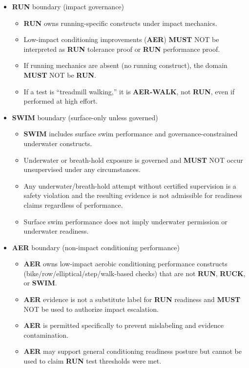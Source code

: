 \documentclass[10pt]{article}
\begin{document}
\begin{itemize}
\item \textbf{RUN} boundary (impact governance)

  \begin{itemize}
  \item \textbf{RUN} owns running-specific constructs under impact mechanics.
  \item Low-impact conditioning improvements (\textbf{AER}) \textbf{MUST} NOT be interpreted as \textbf{RUN} tolerance proof or \textbf{RUN} performance proof.
  \item If running mechanics are absent (no running construct), the domain \textbf{MUST} NOT be \textbf{RUN}.
  \item If a test is “treadmill walking,” it is \textbf{AER-WALK}, not \textbf{RUN}, even if performed at high effort.
  \end{itemize}

\item \textbf{SWIM} boundary (surface-only unless governed)

  \begin{itemize}
  \item \textbf{SWIM} includes surface swim performance and governance-constrained underwater constructs.
  \item Underwater or breath-hold exposure is governed and \textbf{MUST} NOT occur unsupervised under any circumstances.
  \item Any underwater/breath-hold attempt without certified supervision is a safety violation and the resulting evidence is not admissible for readiness claims regardless of performance.
  \item Surface swim performance does not imply underwater permission or underwater readiness.
  \end{itemize}

\item \textbf{AER} boundary (non-impact conditioning performance)

  \begin{itemize}
  \item \textbf{AER} owns low-impact aerobic conditioning performance constructs (bike/row/elliptical/step/walk-based checks) that are not \textbf{RUN}, \textbf{RUCK}, or \textbf{SWIM}.
  \item \textbf{AER} evidence is not a substitute label for \textbf{RUN} readiness and \textbf{MUST} NOT be used to authorize impact escalation.
  \item \textbf{AER} is permitted specifically to prevent mislabeling and evidence contamination.
  \item \textbf{AER} may support general conditioning readiness posture but cannot be used to claim \textbf{RUN} test thresholds were met.
  \end{itemize}


\end{itemize}
\end{document}
